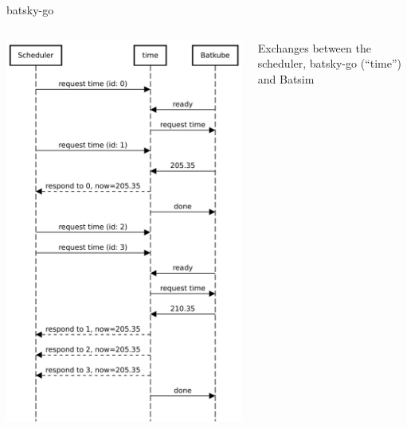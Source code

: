 \documentclass[12pt, aspectratio=43]{beamer}
\begin{document}
\begin{frame}{batsky-go}
	\begin{columns}
		\centering
		\includegraphics[scale=0.38]{../imgs/requester-broker.pdf}
		
		Exchanges between the scheduler, batsky-go (``time'') and Batsim
	\end{columns}
\end{frame}
\end{document}
